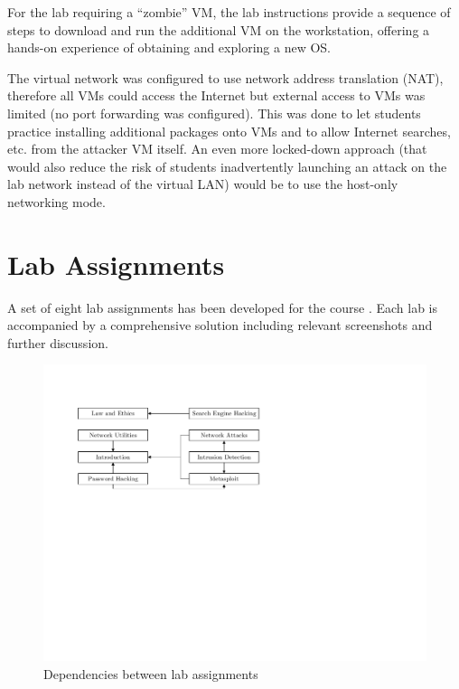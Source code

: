 \documentclass{sig-alternate-2013}
\begin{document}
For the lab requiring a ``zombie'' VM, the lab instructions provide a sequence of steps to download 
and run the additional VM on the workstation, offering a hands-on experience of obtaining and exploring a new OS.

The virtual network was configured to use network address translation (NAT), 
therefore all VMs could access the Internet but external access to VMs
was limited (no port forwarding was configured). This was done to let students practice installing additional packages
onto VMs and to allow Internet searches, etc. from the attacker VM itself.
An even more locked-down approach (that would also reduce the risk of students inadvertently launching an attack
on the lab network instead of the virtual LAN) would be to use the host-only networking mode.

\section{Lab Assignments}
A set of eight lab assignments has been developed for the course \cite{thelabs}. 
Each lab is accompanied by a comprehensive solution including relevant screenshots and further discussion.

\begin{figure}[b!]
\includegraphics[scale=0.6, clip=true, trim=0.85in 4.9in 4.5in 1.2in]{dependencies-between-labs.pdf}
\caption{Dependencies between lab assignments}
\label{fig:labdeps}
\end{figure}
\end{document}
